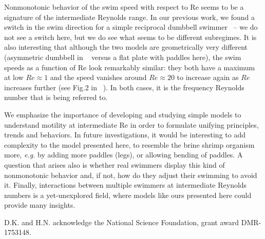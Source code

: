 \documentclass[%
 onecolumn,
superscriptaddress,
 amsmath,amssymb,
 aps,
longbibliography
]{revtex4-2}
\begin{document}
Nonmonotonic behavior of the swim speed with respect to Re seems to be a signature of the intermediate Reynolds range. In our previous work, we found a switch in the swim direction for a simple reciprocal dumbbell swimmer~\cite{Dombrowski2019Transition,Dombrowski2020Kinematics} -- we do not see a switch here, but we do see what seems to be different subregimes. It is also interesting that although the two models are geometrically very different (asymmetric dumbbell in ~\cite{Dombrowski2019Transition,Dombrowski2020Kinematics} versus a flat plate with paddles here), the swim speeds as a function of Re look remarkably similar: they both have a maximum at low $Re\approx1$ and the speed vanishes around $Re\approx20$ to increase again as $Re$ increases further (see Fig.2 in ~\cite{Dombrowski2019Transition}). In both cases, it is the frequency Reynolds number that is being referred to.   

We emphasize the importance of developing and studying simple models to understand motility at intermediate Re in order to formulate unifying principles, trends and behaviors. In future investigations, it would be interesting to add complexity to the model presented here, to resemble the brine shrimp organism more, \textit{e.g.} by adding more paddles (legs), or allowing bending of paddles. A question that arises also is whether real swimmers display this kind of nonmonotonic behavior and, if not, how do they adjust their swimming to avoid it. Finally, interactions between multiple swimmers at intermediate Reynolds numbers is a yet-unexplored field, where models like ours presented here could provide many insights.   


\acknowledgments
D.K. and H.N. acknowledge the National Science Foundation, grant award DMR-1753148. 


\end{document}

